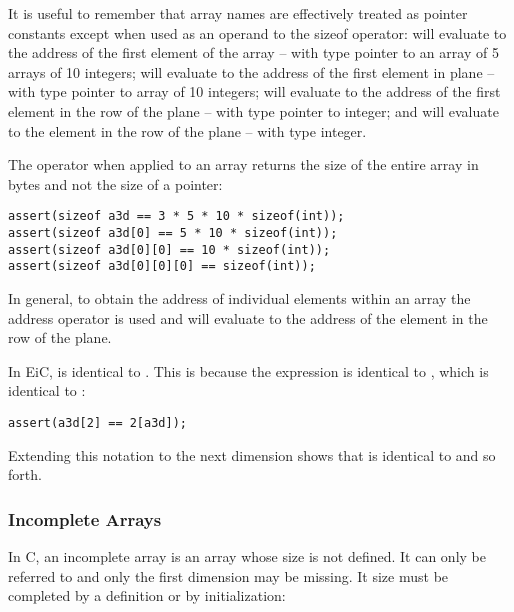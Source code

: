 It is useful to remember that array names are effectively treated as
pointer constants except when used as an operand to the sizeof
operator:  will evaluate to the address of the first element of
the array -- with type pointer to an array of 5 arrays of 10 integers;
 will evaluate to the address of the first element in
 plane -- with type pointer to array of 10 integers;
 will evaluate to the address of the first element in the
 row of the  plane -- with type pointer to integer; and
 will evaluate to the  element in the 
row of the  plane -- with type integer.

The  operator when applied to an array returns the size of
the entire array in bytes and not the size of a pointer:

\begin{production}
\begin{verbatim}
assert(sizeof a3d == 3 * 5 * 10 * sizeof(int));
assert(sizeof a3d[0] == 5 * 10 * sizeof(int));
assert(sizeof a3d[0][0] == 10 * sizeof(int));
assert(sizeof a3d[0][0][0] == sizeof(int));
\end{verbatim}
\end{production}

In general, to obtain the address of individual elements within an
array the address operator \T{\&} is used and  will
evaluate to the address of the  element in the  row of
the  plane.

In EiC,  is identical to . This is because the
expression  is identical to , which is identical to :

\begin{production}
\begin{verbatim}
assert(a3d[2] == 2[a3d]);
\end{verbatim}
\end{production}

Extending this notation to the next dimension shows that
 is identical to  and so forth.

\subsubsection{Incomplete Arrays}
\label{sec:IncompleteArrays}

In C, an incomplete array is an array whose size is not defined. It can only
be referred to and only the first dimension may be missing. It size
must be completed by a definition or by initialization:

